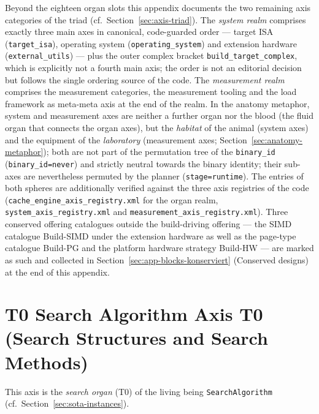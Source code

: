 Beyond the eighteen organ slots this appendix documents the two remaining axis categories of the triad (cf.\ Section~\ref{sec:axis-triad}). The \emph{system realm} comprises exactly three main axes in canonical, code-guarded order --- target ISA (\texttt{target\_\allowbreak{}isa}), operating system (\texttt{operating\_\allowbreak{}system}) and extension hardware (\texttt{external\_\allowbreak{}utils}) --- plus the outer complex bracket \texttt{build\_\allowbreak{}target\_\allowbreak{}complex}, which is explicitly not a fourth main axis; the order is not an editorial decision but follows the single ordering source of the code. The \emph{measurement realm} comprises the measurement categories, the measurement tooling and the load framework as meta-meta axis at the end of the realm. In the anatomy metaphor, system and measurement axes are neither a further organ nor the blood (the fluid organ that connects the organ axes), but the \emph{habitat} of the animal (system axes) and the equipment of the \emph{laboratory} (measurement axes; Section~\ref{sec:anatomy-metaphor}); both are not part of the permutation tree of the \texttt{binary\_\allowbreak{}id} (\texttt{binary\_\allowbreak{}id=never}) and strictly neutral towards the binary identity; their sub-axes are nevertheless permuted by the planner (\texttt{stage=runtime}). The entries of both spheres are additionally verified against the three axis registries of the code (\texttt{cache\_\allowbreak{}engine\_\allowbreak{}axis\_\allowbreak{}registry.xml} for the organ realm, \texttt{system\_\allowbreak{}axis\_\allowbreak{}registry.xml} and \texttt{measurement\_\allowbreak{}axis\_\allowbreak{}registry.xml}). Three conserved offering catalogues outside the build-driving offering --- the SIMD catalogue Build-SIMD under the extension hardware as well as the page-type catalogue Build-PG and the platform hardware strategy Build-HW --- are marked as such and collected in Section~\ref{sec:app-blocks-konserviert} (Conserved designs) at the end of this appendix.

\setlength{\tabcolsep}{3pt}
\section[head={T0 Search Algorithm Axis (Search Structures and Methods)}]{T0 Search Algorithm Axis T0 (Search Structures and Search Methods)}

This axis is the \emph{search organ} (T0) of the living being \texttt{SearchAlgorithm} (cf.\ Section~\ref{sec:sota-instances}).

